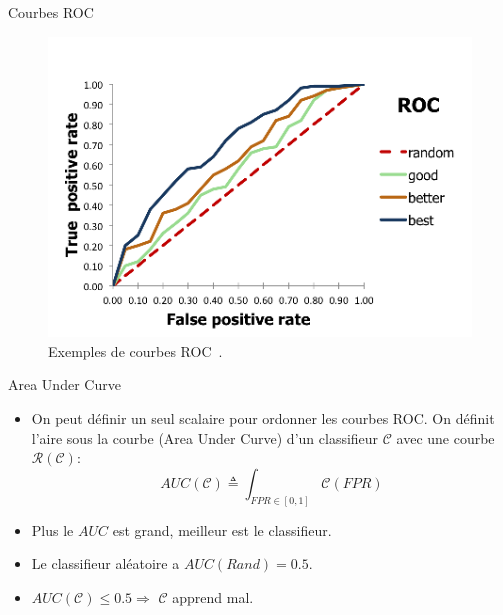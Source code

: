 \documentclass[8pt]{beamer}
\begin{document}
			\begin{frame}{Courbes ROC}
				\begin{figure}[H]
					\includegraphics[width=.6\textwidth]{images/samples/roc_curves.png}
					\caption*{Exemples de courbes ROC~\cite{ROCS}.}
				\end{figure}
			\end{frame}
			\begin{frame}{Area Under Curve}
				\begin{itemize}
					\item<1-> On peut définir un seul scalaire pour ordonner les courbes ROC. On définit l'aire sous la courbe (Area Under Curve) d'un classifieur \(\mathscr{C}\) avec une courbe \(\mathscr{R}(\mathscr{C})\):
					\begin{equation}
						AUC(\mathscr{C}) \triangleq \int_{FPR\in[0,1]} \mathscr{C}(FPR)
					\end{equation}
					\item<2-> Plus le \(AUC\) est grand, meilleur est le classifieur.
					\item<3-> Le classifieur aléatoire a \(AUC(Rand) = 0.5\).
					\item<4->\(AUC(\mathscr{C}) \leq 0.5 \Longrightarrow\) \(\mathscr{C}\) apprend mal.
				\end{itemize}
			\end{frame}
\end{document}
